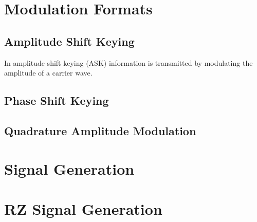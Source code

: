 \section{Modulation Formats}
\subsection{Amplitude Shift Keying}
In amplitude shift keying (ASK)  information is transmitted by modulating the amplitude of a carrier wave. 
\subsection{Phase Shift Keying}

\subsection{Quadrature Amplitude Modulation}


\section{Signal Generation}

\section{RZ Signal Generation}